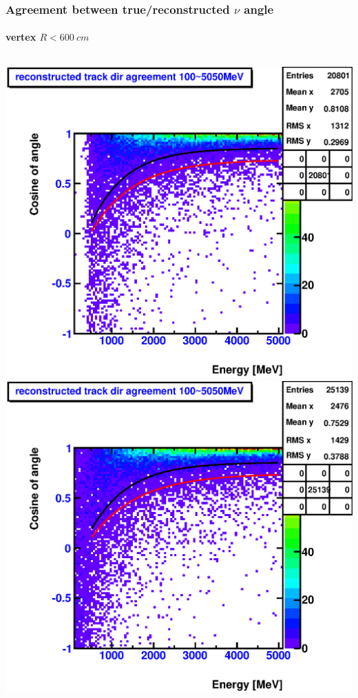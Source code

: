 \documentclass{beamer}
\begin{document}
\begin{frame}
	\frametitle{Agreement between true/reconstructed $\nu$ angle}
	\framesubtitle{vertex $R < \SI{600}{cm}$}
	\begin{columns}[t]
		\includegraphics[width=1.0\textwidth]{material/nue_H1/analyzed_mtq_flatSpectrum_nue_H1_outerBufferFillAll_reconDirAgreementWithMtqTruthVectorVSEnergy_onlyCC_maxR600cm.eps}
		\includegraphics[width=1.0\textwidth]{material/nue_C12/analyzed_mtq_flatSpectrum_nue_C12_outerBufferFillAll_reconDirAgreementWithMtqTruthVectorVSEnergy_onlyCC_maxR600cm.eps}
	\end{columns}
\end{frame}
\end{document}
